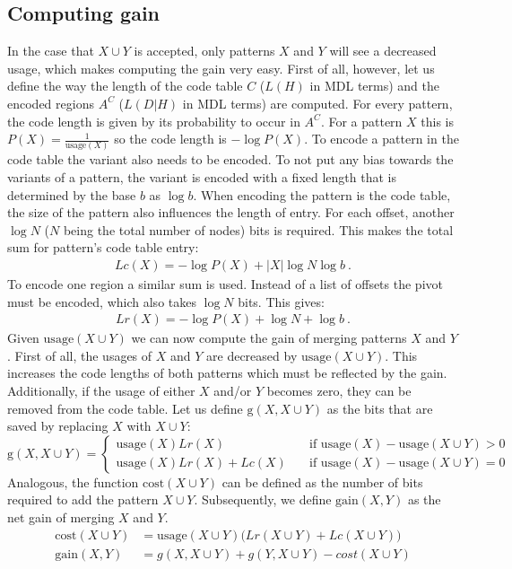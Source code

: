 \documentclass{llncs}
\begin{document}
\subsection{Computing gain}
In the case that $X\cup Y$ is accepted, only patterns $X$ and $Y$ will see a decreased usage, which makes computing the gain very easy. First of all, however, let us define the way the length of the code table $C$ ($L(H)$ in MDL terms) and the encoded regions $A^C$ ($L(D|H)$ in MDL terms) are computed. For every pattern, the code length is given by its probability to occur in $A^C$. For a pattern $X$ this is $P(X) = \frac{1}{\mathrm{usage}(X)}$ so the code length is $-\log P(X)$. To encode a pattern in the code table the variant also needs to be encoded. To not put any bias towards the variants of a pattern, the variant is encoded with a fixed length that is determined by the base $b$ as $\log b$. When encoding the pattern is the code table, the size of the pattern also influences the length of entry. For each offset, another $\log N$ ($N$ being the total number of nodes) bits is required. This makes the total sum for pattern's code table entry:
\begin{align*}
Lc(X) = -\log P(X) + |X| \log N \log b \ .
\end{align*}
To encode one region a similar sum is used. Instead of a list of offsets the pivot must be encoded, which also takes $\log N$ bits. This gives:
\begin{align*}
Lr(X) = -\log P(X) + \log N + \log b \ .
\end{align*}
Given $\mathrm{usage}(X\cup Y)$ we can now compute the gain of merging patterns $X$ and $Y$. First of all, the usages of $X$ and $Y$ are decreased by $\mathrm{usage}(X\cup Y)$. This increases the code lengths of both patterns which must be reflected by the gain. Additionally, if the usage of either $X$ and/or $Y$ becomes zero, they can be removed from the code table. Let us define $\mathrm{g}(X,X\cup Y)$ as the bits that are saved by replacing $X$ with $X\cup Y$:
\[ \mathrm{g}(X,X\cup Y) =
  \begin{cases}
     \mathrm{usage}(X)Lr(X) & \quad \text{if }\mathrm{usage}(X)-\mathrm{usage}(X\cup Y)>0\\
     \mathrm{usage}(X)Lr(X) + Lc(X) & \quad \text{if }\mathrm{usage}(X)-\mathrm{usage}(X\cup Y)=0
  \end{cases}
\]
Analogous, the function $\mathrm{cost}(X\cup Y)$ can be defined as the number of bits required to add the pattern $X\cup Y$. Subsequently, we define $\mathrm{gain}(X,Y)$ as the net gain of merging $X$ and $Y$.
\begin{align*}
\mathrm{cost}(X\cup Y) &= \mathrm{usage}(X\cup Y)\Big(Lr(X\cup Y) + Lc(X\cup Y)\Big) \\
\mathrm{gain}(X,Y) &= g(X,X\cup Y) + g(Y,X\cup Y) - cost(X\cup Y)
\end{align*}
\end{document}

